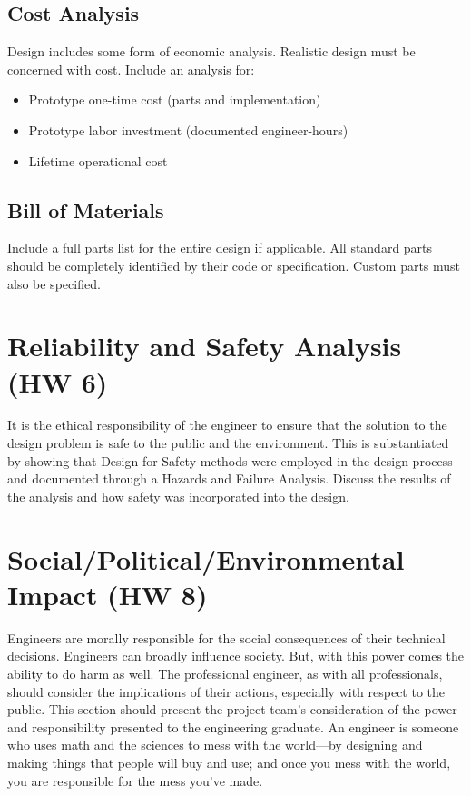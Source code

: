 \documentclass[12pt]{article}
\begin{document}
\subsection{Cost Analysis}
Design includes some form of economic analysis. Realistic design must be concerned with cost. Include an analysis for:
\begin{itemize}[noitemsep]
    \item Prototype one-time cost (parts and implementation)
    \item Prototype labor investment (documented engineer-hours)
    \item Lifetime operational cost
\end{itemize}

\subsection{Bill of Materials}
Include a full parts list for the entire design if applicable. All standard parts should be completely identified by their code or specification. Custom parts must also be specified.

\section{Reliability and Safety Analysis (HW 6)}
It is the ethical responsibility of the engineer to ensure that the solution to the design problem is safe to the public and the environment. This is substantiated by showing that Design for Safety methods were employed in the design process and documented through a Hazards and Failure Analysis. Discuss the results of the analysis and how safety was incorporated into the design.

\section{Social/Political/Environmental Impact (HW 8)}
Engineers are morally responsible for the social consequences of their technical decisions. Engineers can broadly influence society. But, with this power comes the ability to do harm as well. The professional engineer, as with all professionals, should consider the implications of their actions, especially with respect to the public. This section should present the project team's consideration of the power and responsibility presented to the engineering graduate. An engineer is someone who uses math and the sciences to mess with the world—by designing and making things that people will buy and use; and once you mess with the world, you are responsible for the mess you’ve made.
\end{document}

